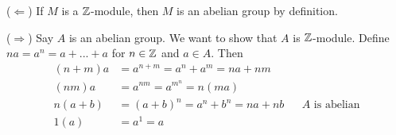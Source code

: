 ($\Leftarrow$) If $M$ is a $\Bbb Z$-module, then $M$ is an abelian group by definition.

($\Rightarrow$) Say $A$ is an abelian group. We want to show that $A$ is $\Bbb Z$-module. Define $na = a^n = a + ... +a$ for $n\in \Bbb Z$ and $a \in A$. Then 
\begin{align*}
(n+m)a &= a^{n+m}=a^n+a^m= na + nm \\
(nm)a &= a^{nm} = a^{m}^n = n(ma) \\
n(a+b) &= (a+b)^n = a^n + b^n = na + nb &&\text{$A$ is abelian} \\
1(a) &= a^1 = a
\end{align*}

